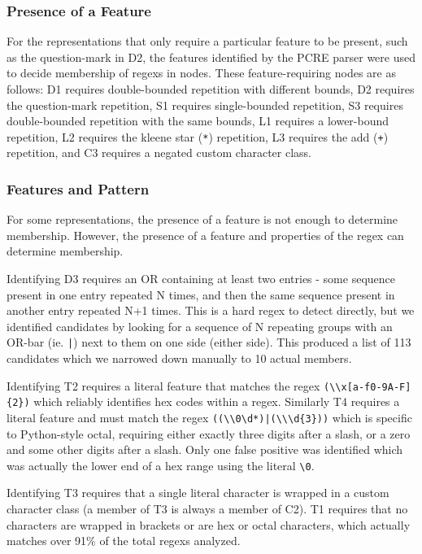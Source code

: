 \subsubsection{Presence of a Feature}
For the representations that only require a particular feature to be present, such as the question-mark in D2, the features identified by the PCRE parser were used to decide membership of regexs in nodes.
These feature-requiring nodes are as follows: D1 requires double-bounded repetition with different bounds, D2 requires the question-mark repetition, S1 requires single-bounded repetition, S3 requires double-bounded repetition with the same bounds,  L1 requires a lower-bound repetition, L2 requires the kleene star (\verb!*!) repetition, L3 requires the add (\verb!+!) repetition, and C3 requires a negated custom character class.

\subsubsection{Features  and Pattern}
For some representations, the presence of a feature is not enough to determine membership.
However,  the presence of a feature and properties of the regex can determine membership.

Identifying D3 requires an OR containing at least two entries - some sequence present in one entry repeated N times, and then the same sequence present in another entry repeated N+1 times.  This is a hard regex to detect directly, but we identified candidates by looking for a sequence of N repeating groups with an OR-bar (ie. \verb!|!) next to them on one side (either side).  This produced a list of 113 candidates which we narrowed down manually to 10 actual members.

Identifying T2 requires a literal feature that matches the regex \verb!(\\x[a-f0-9A-F]{2})! which reliably identifies hex codes within a regex.
Similarly T4 requires a literal feature and must match the regex \verb!((\\0\d*)|(\\\d{3}))! which is specific to Python-style octal, requiring either exactly three digits after a slash, or a zero and some other digits after a slash.  Only one false positive was identified which was actually the lower end of a hex range using the literal \verb!\0!.

Identifying T3 requires that a single literal character is wrapped in a custom character class (a member of T3 is always a member of C2).
 T1 requires that no characters are wrapped in brackets or are hex or octal characters, which actually matches over 91\% of the total regexs analyzed.

